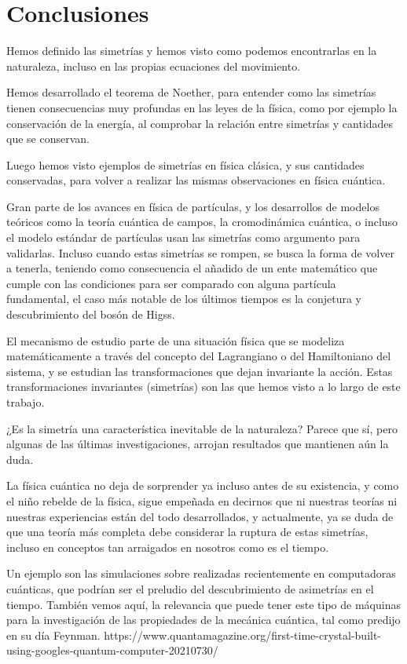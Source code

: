 \chapter{Conclusiones}\label{ch:conclusiones}
Hemos definido las simetrías y hemos visto como podemos encontrarlas en la naturaleza, incluso en las propias ecuaciones del movimiento.

Hemos desarrollado el teorema de Noether, para entender como las simetrías tienen consecuencias muy profundas en las leyes de la física, como por ejemplo la conservación de la energía, al comprobar la relación entre simetrías y cantidades que se conservan.

Luego hemos visto ejemplos de simetrías en física clásica, y sus cantidades conservadas, para volver a realizar las mismas observaciones en física cuántica.

Gran parte de los avances en física de partículas, y los desarrollos de modelos teóricos como la teoría cuántica de campos, la cromodinámica cuántica, o incluso el modelo estándar de partículas usan las simetrías como argumento para validarlas.
Incluso cuando estas simetrías se rompen, se busca la forma de volver a tenerla, teniendo como consecuencia el añadido de un ente matemático que cumple con las condiciones para ser comparado con alguna partícula fundamental, el caso más notable de los últimos tiempos es la conjetura y descubrimiento del bosón de Higss.

El mecanismo de estudio parte de una situación física que se modeliza matemáticamente a través del concepto del Lagrangiano o del Hamiltoniano del sistema, y se estudian las transformaciones que dejan invariante la acción.
Estas transformaciones invariantes (simetrías) son las que hemos visto a lo largo de este trabajo.

¿Es la simetría una característica inevitable de la naturaleza?
Parece que sí, pero algunas de las últimas investigaciones, arrojan resultados que mantienen aún la duda.

La física cuántica no deja de sorprender ya incluso antes de su existencia, y como el niño rebelde de la física, sigue empeñada en decirnos que ni nuestras teorías ni nuestras experiencias están del todo desarrollados, y actualmente, ya se duda de que una teoría más completa debe considerar la ruptura de estas simetrías, incluso en conceptos tan arraigados en nosotros como es el tiempo.

Un ejemplo son las simulaciones sobre  realizadas recientemente en computadoras cuánticas, que podrían ser el preludio del descubrimiento de asimetrías en el tiempo. También vemos aquí, la relevancia que puede tener este tipo de máquinas para la investigación de las propiedades de la mecánica cuántica, tal como predijo en su día Feynman.
https://www.quantamagazine.org/first-time-crystal-built-using-googles-quantum-computer-20210730/


